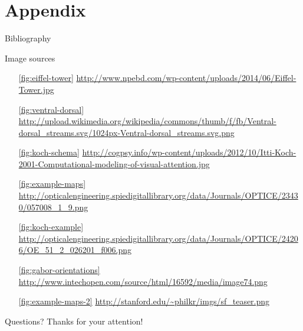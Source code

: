 \documentclass[compress,t]{beamer}
\begin{document}
\section{Appendix}
\begin{frame}[allowframebreaks]{Bibliography}

    \nocite{*}
    \scriptsize
    
    

\end{frame}

\begin{frame}[allowframebreaks]{Image sources}
    \scriptsize

    \begin{enumerate}
        \item[\ref{fig:eiffel-tower}]
            \url{http://www.npebd.com/wp-content/uploads/2014/06/Eiffel-Tower.jpg}

        \item[\ref{fig:ventral-dorsal}]
            \url{http://upload.wikimedia.org/wikipedia/commons/thumb/f/fb/Ventral-dorsal_streams.svg/1024px-Ventral-dorsal_streams.svg.png}

        \item[\ref{fig:koch-schema}]
            \url{http://cogpsy.info/wp-content/uploads/2012/10/Itti-Koch-2001-Computational-modeling-of-visual-attention.jpg}

        \item[\ref{fig:example-maps}]
            \url{http://opticalengineering.spiedigitallibrary.org/data/Journals/OPTICE/23430/057008_1_9.png}

        \item[\ref{fig:koch-example}]
            \url{http://opticalengineering.spiedigitallibrary.org/data/Journals/OPTICE/24206/OE_51_2_026201_f006.png}

        \item[\ref{fig:gabor-orientations}]
            \url{http://www.intechopen.com/source/html/16592/media/image74.png}

        \item[\ref{fig:example-maps-2}]
            \url{http://stanford.edu/~philkr/imgs/sf_teaser.png}
    \end{enumerate}
\end{frame}

\begin{frame}{Questions?}
    \pause
    \vspace{3cm}
    \centering
    \large{Thanks for your attention!}
\end{frame}
\end{document}
